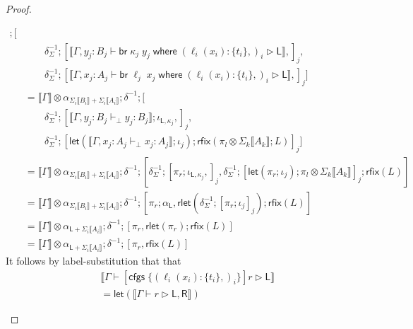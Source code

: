 \documentclass[acmsmall,screen,review]{acmart}
\newcommand{\ms}[1]{\ensuremath{\mathsf{#1}}}
\newcommand{\lto}{:}
\newcommand{\brb}[2]{\ms{br}\;#1\;#2}
\newcommand{\where}[2]{#1\;\ms{where}\;#2}
\newcommand{\wbranch}[3]{#1(#2) \lto \{#3\}}
\newcommand{\cfgsubst}[1]{\ms{cfgs}\;\{#1\}}
\newcommand{\bhyp}[2]{#1 : #2}
\newcommand{\hasty}[4]{#1 \vdash_{#2} #3: {#4}}
\newcommand{\haslb}[3]{#1 \vdash #2 \rhd #3}
\newcommand{\dnt}[1]{\llbracket{#1}\rrbracket}
\newcommand{\lmor}[1]{\ms{let}(#1)}
\newcommand{\rlmor}[1]{\ms{rlet}(#1)}
\newcommand{\rfix}[1]{\ms{rfix}(#1)}
\begin{document}
\begin{proof}
\begin{itemize}[leftmargin=*]
\begin{equation}
\begin{aligned}
          ; [ \\ & \qquad
            \delta^{-1}_{\Sigma} 
            ; [\dnt{\haslb{\Gamma, \bhyp{y_j}{B_j}}
                {\where{\brb{\kappa_j}{y_j}}{(\wbranch{\ell_i}{x_i}{t_i},)_i}}{\ms{L}}},]_j, 
                \\ & \qquad
            \delta^{-1}_{\Sigma} 
            ; [\dnt{\haslb{\Gamma, \bhyp{x_j}{A_j}}
            {\where{\brb{\ell_j}{x_j}}{(\wbranch{\ell_i}{x_i}{t_i},)_i}}{\ms{L}}},]_j
          ] \\
        & = \dnt{\Gamma} \otimes \alpha_{\Sigma_i\dnt{B_i} + \Sigma_i\dnt{A_i}}; \delta^{-1}
          ; [ \\ & \qquad
            \delta^{-1}_{\Sigma} 
            ; [\dnt{\hasty{\Gamma, \bhyp{y_j}{B_j}}{\bot}{y_j}{B_j}} ; \iota_{\ms{L}, \kappa_j},]_j, 
                \\ & \qquad
            \delta^{-1}_{\Sigma} 
            ; [
              \lmor{\dnt{\hasty{\Gamma, \bhyp{x_j}{A_j}}{\bot}{x_j}{A_j}} ; \iota_j} 
              ; \rfix{\pi_l \otimes \Sigma_k\dnt{A_k} ; L}
            ]_j
          ] \\
        & = \dnt{\Gamma} \otimes \alpha_{\Sigma_i\dnt{B_i} + \Sigma_i\dnt{A_i}}; \delta^{-1}
          ; [
            \delta^{-1}_{\Sigma} ; [\pi_r ; \iota_{\ms{L}, \kappa_j},]_j, 
            \delta^{-1}_{\Sigma} ; [\lmor{\pi_r ; \iota_j} ; \pi_l \otimes \Sigma_k\dnt{A_k}]_j 
            ; \rfix{L}
          ] \\
        & = \dnt{\Gamma} \otimes \alpha_{\Sigma_i\dnt{B_i} + \Sigma_i\dnt{A_i}}; \delta^{-1}
          ; [
            \pi_r ; \alpha_{\ms{L}}, 
            \rlmor{\delta^{-1}_{\Sigma} ; [\pi_r ; \iota_j]_j}
            ; \rfix{L}
          ] \\
        & = \dnt{\Gamma} \otimes \alpha_{\ms{L} + \Sigma_i\dnt{A_i}}; \delta^{-1}
          ; [
            \pi_r, 
            \rlmor{\pi_r} ; \rfix{L}
          ] \\
        & = \dnt{\Gamma} \otimes \alpha_{\ms{L} + \Sigma_i\dnt{A_i}}; \delta^{-1} 
          ; [\pi_r, \rfix{L}]
      \end{aligned}
    \end{equation}
    It follows by label-substitution that that
    \begin{equation}
      \begin{aligned}
        & \dnt{\haslb{\Gamma}{[\cfgsubst{(\wbranch{\ell_i}{x_i}{t_i},)_i}]r}{\ms{L}}}  \\
        & = \lmor{\dnt{\haslb{\Gamma}{r}{\ms{L}, \ms{R}}}}

\end{aligned}
\end{equation}
\end{itemize}
\end{proof}
\end{document}
